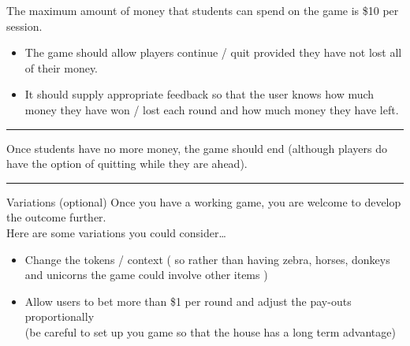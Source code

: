\documentclass[a4paper,12pt]{article}
\begin{document}
The maximum amount of money that students can spend on the game is \$10 per session. 
 \begin{itemize}
	\item The game should allow players continue / quit provided they have not lost all of their money. 
	\item  It should supply appropriate feedback so that the user knows how much money they have won / lost each round and how much money they have left.
\end{itemize}
\hrule \vspace{0.5cm}

Once students have no more money, the game should end (although players do have the option of quitting while they are ahead).\\

\hrule \vspace{0.5cm}


Variations (optional)
Once you have a working game, you are welcome to develop the outcome further.  \\
Here are some variations you could consider…
\begin{itemize}
	\item Change the tokens / context ( so rather than having zebra, horses, donkeys and unicorns the game could involve other items )
	\item Allow users to bet more than \$1 per round and adjust the pay-outs proportionally\\ 
(be careful to set up you game so that the house has a long term advantage)
\end{itemize}


\newpage
\end{document}

